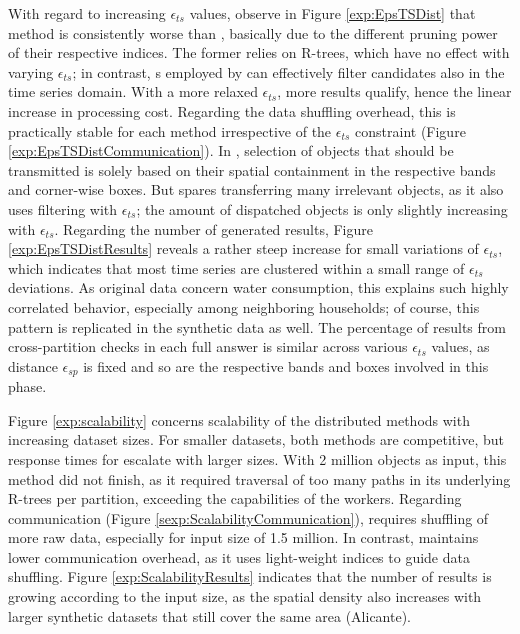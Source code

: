 With regard to increasing $\epsilon_{ts}$ values, observe in Figure \ref{exp:EpsTSDist} that method \base is consistently worse than \opt, basically due to the different pruning power of their respective indices. The former relies on R-trees, which have no effect with varying $\epsilon_{ts}$; in contrast, {\btsr}s employed by \opt can effectively filter candidates also in the time series domain. With a more relaxed $\epsilon_{ts}$, more results qualify, hence the linear increase in processing cost. Regarding the data shuffling overhead, this is practically stable for each method irrespective of the $\epsilon_{ts}$ constraint (Figure \ref{exp:EpsTSDistCommunication}). In \base, selection of objects that should be transmitted is solely based on their spatial containment in the respective bands and corner-wise boxes. But \opt spares transferring many irrelevant objects, as it also uses filtering with $\epsilon_{ts}$; the amount of dispatched objects is only slightly increasing with $\epsilon_{ts}$. Regarding the number of generated results, Figure \ref{exp:EpsTSDistResults} reveals a rather steep increase for small variations of $\epsilon_{ts}$, which indicates that most time series are clustered within a small range of $\epsilon_{ts}$ deviations. As original data concern water consumption, this explains such highly correlated behavior, especially among neighboring households; of course, this pattern is replicated in the synthetic data as well. The percentage of results from cross-partition checks in each full answer is similar across various $\epsilon_{ts}$ values, as distance $\epsilon_{sp}$ is fixed and so are the respective bands and boxes involved in this phase.


Figure \ref{exp:scalability} concerns scalability of the distributed methods with increasing dataset sizes. For smaller datasets, both methods are competitive, but response times for \base escalate with larger sizes. With 2 million objects as input, this method did not finish, as it required traversal of too many paths in its underlying R-trees per partition, exceeding the capabilities of the workers. Regarding communication (Figure \ref{sexp:ScalabilityCommunication}), \base requires shuffling of more raw data, especially for input size of 1.5 million. In contrast, \opt maintains lower communication overhead, as it uses light-weight indices to guide data shuffling. Figure \ref{exp:ScalabilityResults} indicates that the number of results is growing according to the input size, as the spatial density also increases with larger synthetic datasets that still cover  the same area (Alicante).



